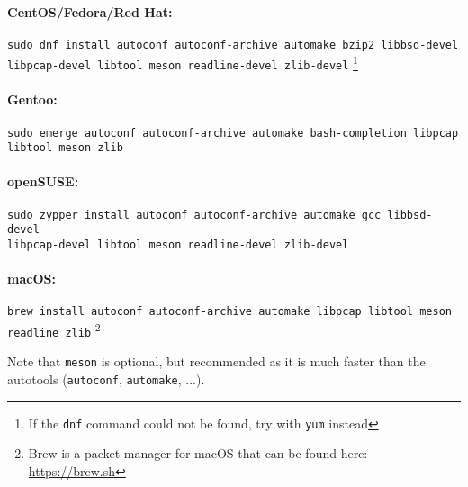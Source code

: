 \paragraph{CentOS/Fedora/Red Hat:}
\begin{center}
    \begin{small}
        {\tt sudo dnf install autoconf autoconf-archive automake bzip2 libbsd-devel\\libpcap-devel libtool meson readline-devel zlib-devel}
        \footnote{If the {\tt dnf} command could not be found, try with {\tt yum} instead}
    \end{small}
\end{center}

\paragraph{Gentoo:}
\begin{center}
    \begin{small}
        {\tt sudo emerge autoconf autoconf-archive automake bash-completion libpcap libtool meson zlib}
    \end{small}
\end{center}

\paragraph{openSUSE:}
\begin{center}
    \begin{small}
        {\tt sudo zypper install autoconf autoconf-archive automake gcc libbsd-devel\\libpcap-devel libtool meson readline-devel zlib-devel}
    \end{small}
\end{center}

\paragraph{macOS:}
\begin{center}
    \begin{small}
        {\tt brew install autoconf autoconf-archive automake libpcap libtool meson readline zlib}
        \footnote{Brew is a packet manager for macOS that can be found here: \url{https://brew.sh}}
    \end{small}
\end{center}

Note that {\tt meson} is optional, but recommended as it is much faster than the autotools ({\tt autoconf}, {\tt automake}, ...).

